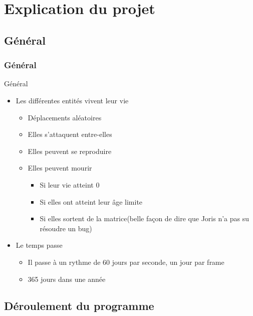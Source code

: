 \documentclass{beamer}
\begin{document}
\section{Explication du projet}
\subsection{Général}

\begin{frame} \frametitle{Général}
	\begin{block}{Général}
		\begin{itemize}
			\item Les différentes entités vivent leur vie
				\begin{itemize}
					\item Déplacements aléatoires
					\item Elles s'attaquent entre-elles
					\item Elles peuvent se reproduire
					\item Elles peuvent mourir
						\begin{itemize}
							\item Si leur vie atteint 0
							\item Si elles ont atteint leur âge limite
							\item Si elles sortent de la matrice(belle façon de dire que Joris n'a pas su résoudre un bug)
						\end{itemize}
				\end{itemize}
			\item Le temps passe
				\begin{itemize}
					\item Il passe à un rythme de 60 jours par seconde, un jour par frame
			\item 365 jours dans une année
				\end{itemize}
		\end{itemize}
	\end{block}
\end{frame}

\subsection{Déroulement du programme}
\end{document}
